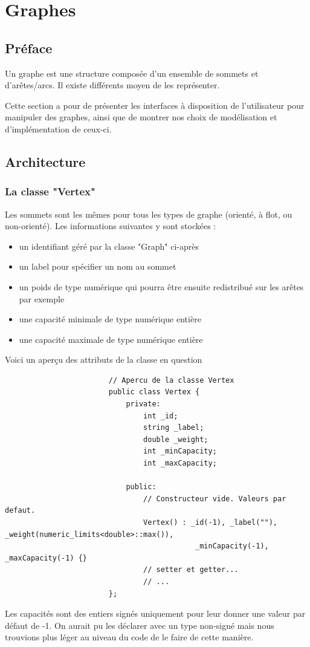 \documentclass[french]{article}
\begin{document}
	\section{Graphes}
	\label{sec:graphes}
		\subsection{Préface}
		Un graphe est une structure composée d'un ensemble de sommets et d'arêtes/arcs. Il existe différents moyen de les représenter.
		
		Cette section a pour de présenter les interfaces à disposition de l'utilisateur pour manipuler des graphes, ainsi que de montrer nos choix de modélisation et d'implémentation de ceux-ci.
		
		\subsection{Architecture}
		
			\subsubsection{La classe "Vertex"}
			Les sommets sont les mêmes pour tous les types de graphe (orienté, à flot, ou non-orienté). Les informations suivantes y sont stockées :
			\begin{itemize}
				\item un identifiant géré par la classe "Graph" ci-après
				\item un label pour spécifier un nom au sommet
				\item un poids de type numérique qui pourra être ensuite redistribué sur les arêtes par exemple
				\item une capacité minimale de type numérique entière
				\item une capacité maximale de type numérique entière 
			\end{itemize}
			Voici un aperçu des attributs de la classe en question
			\begin{lstlisting}
						// Apercu de la classe Vertex
						public class Vertex {
							private:
								int _id;
								string _label;
								double _weight;
								int _minCapacity;
								int _maxCapacity;
								
							public:
								// Constructeur vide. Valeurs par defaut.
								Vertex() : _id(-1), _label(""), _weight(numeric_limits<double>::max()),
											_minCapacity(-1), _maxCapacity(-1) {}
								// setter et getter...
								// ...
						};
			\end{lstlisting}
			Les capacités sont des entiers signés uniquement pour leur donner une valeur par défaut de -1. On aurait pu les déclarer avec un type non-signé mais nous trouvions plus léger au niveau du code de le faire de cette manière.
			
\end{document}
